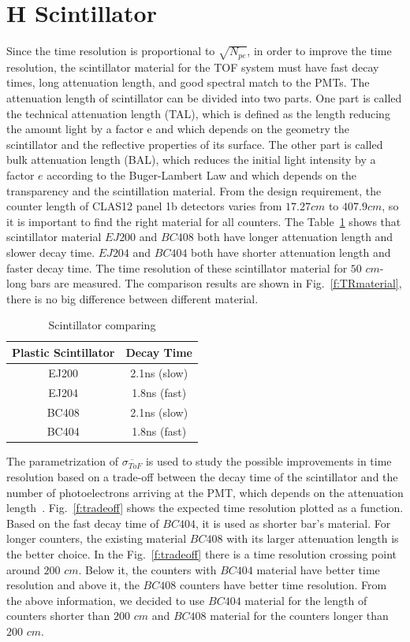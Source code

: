 \section{H Scintillator}
Since the time resolution is proportional to $\sqrt{N_{pe}}$, in order to improve the time resolution, the scintillator material for the TOF system must have fast decay times, long attenuation length, and good spectral match to the PMTs. The attenuation length of scintillator can be divided into two parts. One part is called the technical attenuation length (TAL), which is defined as the length reducing the amount light by a factor e and which depends
on the geometry the scintillator and the reflective properties of its surface. The other part is called bulk attenuation length (BAL), which reduces the initial light intensity by a factor $e$ according to the Buger-Lambert Law and which depends on the transparency and the scintillation material. From the design requirement, the counter length of CLAS12 panel 1b detectors varies from $17.27cm$ to $407.9cm$, so it is important to find the right material for all counters. The Table~\ref{table1} shows that scintillator material $EJ200$ and $BC408$ both have longer attenuation length and slower decay time. $EJ204$ and $BC404$ both have shorter attenuation length and faster decay time. The time resolution of these scintillator material for $50$ $cm$-long bars are measured. The comparison results are shown in Fig.~\ref{f:TRmaterial}, there is no big difference between different material.

\begin{table}[h]
\begin{center}
\begin{tabular}{|c|c|}
\hline
Plastic Scintillator &
\multicolumn{1}{|c|}{Decay Time}\\
\hline
EJ200  &     2.1ns (slow)\\
EJ204  &     1.8ns (fast)\\
BC408  &     2.1ns (slow)\\
BC404  &     1.8ns (fast)\\
\hline
\end{tabular}
\caption{Scintillator comparing}
\label{table1}
\end{center}
\end{table}

The parametrization of $\overline{\sigma_{ToF}}$ is used to study the possible improvements in time resolution based on a trade-off between the decay time of the scintillator and the number of photoelectrons arriving at the PMT, which depends on the attenuation length~\cite{smith1999time}. Fig.~\ref{f:tradeoff} shows the expected time resolution plotted as a function. Based on the fast decay time of $BC404$, it is used as shorter bar's material. For longer counters, the existing material $BC408$ with its larger attenuation length is the better choice. In the Fig.~\ref{f:tradeoff} there is a time resolution crossing point around $200$ $cm$. Below it, the counters with $BC404$ material have better time resolution and above it, the $BC408$ counters have better time resolution. From the above information, we decided to use $BC404$ material for the length of counters shorter than $200$ $cm$ and $BC408$ material for the counters longer than $200$ $cm$.

